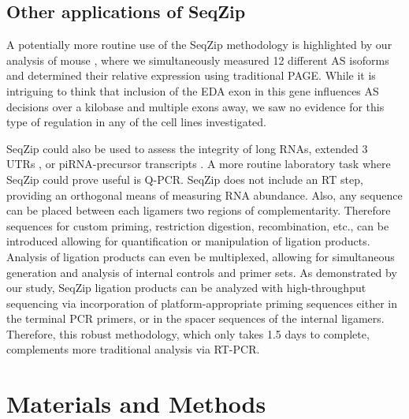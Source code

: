 	\subsection{Other applications of SeqZip}

		A potentially more routine use of the SeqZip methodology is highlighted by our analysis of mouse \fn{}, where we simultaneously measured 12 different AS isoforms and determined their relative expression using traditional PAGE. While it is intriguing to think that inclusion of the EDA exon in this gene influences AS decisions over a kilobase and multiple exons away, we saw no evidence for this type of regulation in any of the cell lines investigated.

		SeqZip could also be used to assess the integrity of long RNAs, extended 3\textprime~ UTRs \citep{Wang2013b}, or piRNA-precursor transcripts \citep{Li2013h}. A more routine laboratory task where SeqZip could prove useful is Q-PCR. SeqZip does not include an RT step, providing an orthogonal means of measuring RNA abundance. Also, any sequence can be placed between each ligamers two regions of complementarity. Therefore sequences for custom priming, restriction digestion, recombination, etc., can be introduced allowing for quantification or manipulation of ligation products. Analysis of ligation products can even be multiplexed, allowing for simultaneous generation and analysis of internal controls and primer sets. As demonstrated by our \dscam{} study, SeqZip ligation products can be analyzed with high-throughput sequencing via incorporation of platform-appropriate priming sequences either in the terminal PCR primers, or in the spacer sequences of the internal ligamers. Therefore, this robust methodology, which only takes 1.5 days to complete, complements more traditional analysis via RT-PCR. 

\section{Materials and Methods}\label{SeqZipPaper:sec: Methods and Materials}

